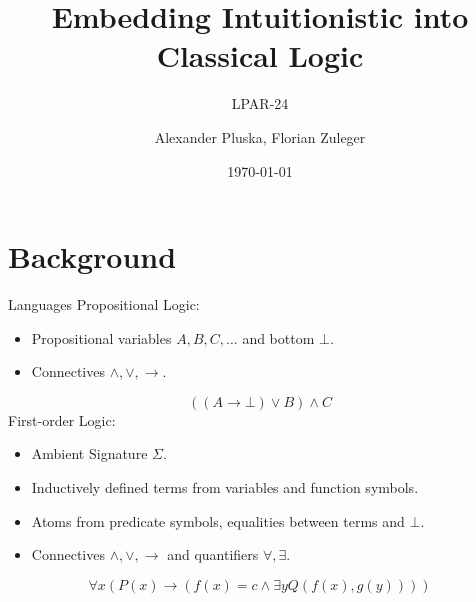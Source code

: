 \documentclass{cubeamer}
\title{Embedding Intuitionistic into Classical Logic}
\subtitle{LPAR-24}
\author[A. Pluska, F. Zuleger]{Alexander Pluska, Florian Zuleger}
\date{\today} %
\institute[TU Vienna]{Vienna University of Technology}
\begin{document}
	
	\maketitle
	
	\cutoc
	
	\section{Background}
	
	\begin{frame}{Languages}
		Propositional Logic:
		\begin{itemize}
			\item Propositional variables $A, B, C, \dots$ and bottom $\bot$.
			\item Connectives $\wedge, \vee, \to$.
		\end{itemize}
		\[((A\to\bot)\vee B)\wedge C\]
		First-order Logic:
		\begin{itemize}
			\item Ambient Signature $\Sigma$.
			\item Inductively defined terms from variables and function symbols.
			\item Atoms from predicate symbols, equalities between terms and $\bot$.
			\item Connectives $\wedge, \vee, \to$ and quantifiers $\forall, \exists$.
		\end{itemize}
		\[\forall x (P(x)\to (f(x) = c\wedge \exists y Q(f(x), g(y))))\]
	\end{frame}
	
\end{document}
